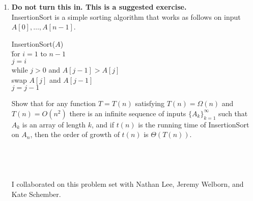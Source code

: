 \documentclass[11pt]{article}
\begin{document}
\begin{enumerate}
\begin{itemize}
\end{itemize}

\item {\bf Do not turn this in.  This is a suggested exercise.}  \\
InsertionSort is a simple sorting algorithm that works as follows on input $A[0], \ldots, A[n-1]$.


\begin{tabbing}

InsertionSort($A$) \\
\quad\quad \= for $i=1$ to $n-1$\\       
           \> \quad $j=i$ \\ 
           \> \quad while $j > 0$ and $A[j-1] > A[j]$ \\ 
           \> \quad \quad swap $A[j]$ and $A[j-1]$ \\ 
           \> \quad \quad $j = j-1$\\
\end{tabbing}

Show that for any function $T = T(n)$ satisfying $T(n) = \Omega(n)$ and $T(n) = O(n^2)$ there is an
infinite sequence of inputs $\{A_k\}_{k=1}^\infty$ such that $A_k$ is an array of length $k$, and
if $t(n)$ is the running time of InsertionSort on $A_n$, then the order of growth of $t(n)$ is
$\Theta(T(n))$.  
\\\\\\\\\\

I collaborated on this problem set with Nathan Lee, Jeremy Welborn, and Kate Schember.
\end{enumerate}
\end{document}
